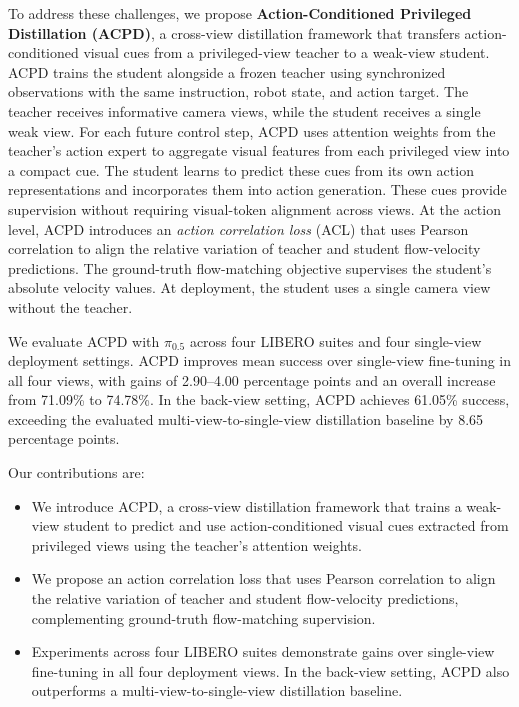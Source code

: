 To address these challenges, we propose \textbf{Action-Conditioned Privileged Distillation (ACPD)}, a cross-view distillation framework that transfers action-conditioned visual cues from a privileged-view teacher to a weak-view student.
ACPD trains the student alongside a frozen teacher using synchronized observations with the same instruction, robot state, and action target. The teacher receives informative camera views, while the student receives a single weak view. For each future control step, ACPD uses attention weights from the teacher's action expert to aggregate visual features from each privileged view into a compact cue. The student learns to predict these cues from its own action representations and incorporates them into action generation. These cues provide supervision without requiring visual-token alignment across views.
At the action level, ACPD introduces an \textit{action correlation loss} (ACL) that uses Pearson correlation to align the relative variation of teacher and student flow-velocity predictions. The ground-truth flow-matching objective supervises the student's absolute velocity values. At deployment, the student uses a single camera view without the teacher.

We evaluate ACPD with $\pi_{0.5}$ across four LIBERO suites and four single-view deployment settings. ACPD improves mean success over single-view fine-tuning in all four views, with gains of 2.90--4.00 percentage points and an overall increase from 71.09\% to 74.78\%. In the back-view setting, ACPD achieves 61.05\% success, exceeding the evaluated multi-view-to-single-view distillation baseline by 8.65 percentage points.


Our contributions are:
\begin{itemize}
    \item We introduce ACPD, a cross-view distillation framework that trains a weak-view student to predict and use action-conditioned visual cues extracted from privileged views using the teacher's attention weights.
    \item We propose an action correlation loss that uses Pearson correlation to align the relative variation of teacher and student flow-velocity predictions, complementing ground-truth flow-matching supervision.
    \item Experiments across four LIBERO suites demonstrate gains over single-view fine-tuning in all four deployment views. In the back-view setting, ACPD also outperforms a multi-view-to-single-view distillation baseline.
\end{itemize}

